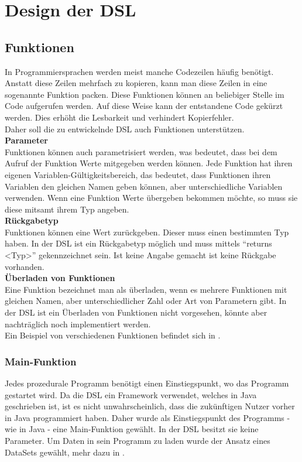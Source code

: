 
\chapter{Design der DSL}

\section{Funktionen}
In Programmiersprachen werden meist manche Codezeilen häufig benötigt.
Anstatt diese Zeilen mehrfach zu kopieren, kann man diese Zeilen in eine sogenannte Funktion packen.
Diese Funktionen können an beliebiger Stelle im Code aufgerufen werden.
Auf diese Weise kann der entstandene Code gekürzt werden.
Dies erhöht die Lesbarkeit und verhindert Kopierfehler.\\
Daher soll die zu entwickelnde \ac{DSL} auch Funktionen unterstützen.\\
\textbf{Parameter}\\
Funktionen können auch parametrisiert werden, was bedeutet, dass bei dem Aufruf der Funktion Werte mitgegeben werden können.
Jede Funktion hat ihren eigenen Variablen-Gültigkeitsbereich, das bedeutet, dass Funktionen ihren Variablen den gleichen Namen geben können, aber unterschiedliche Variablen verwenden.
Wenn eine Funktion Werte übergeben bekommen möchte, so muss sie diese mitsamt ihrem Typ angeben.\\
\textbf{Rückgabetyp}\\
Funktionen können eine Wert zurückgeben.
Dieser muss einen bestimmten Typ haben.
In der DSL ist ein Rückgabetyp möglich und muss mittels ``returns <Typ>'' gekennzeichnet sein.
Ist keine Angabe gemacht ist keine Rückgabe vorhanden.\\
\textbf{Überladen von Funktionen}\\
Eine Funktion bezeichnet man als überladen, wenn es mehrere Funktionen mit gleichen Namen, aber unterschiedlicher Zahl oder Art von Parametern gibt.
In der DSL ist ein Überladen von Funktionen nicht vorgesehen, könnte aber nachträglich noch implementiert werden.\\
Ein Beispiel von verschiedenen Funktionen befindet sich in .\\

\subsection{Main-Funktion}
Jedes prozedurale Programm benötigt einen Einstiegspunkt, wo das Programm gestartet wird.
Da die DSL ein Framework verwendet, welches in Java geschrieben ist, ist es nicht unwahrscheinlich, dass die zukünftigen Nutzer vorher in Java programmiert haben.
Daher wurde als Einstiegspunkt des Programms - wie in Java - eine Main-Funktion gewählt.
In der DSL besitzt sie keine Parameter.
Um Daten in sein Programm zu laden wurde der Ansatz eines DataSets gewählt, mehr dazu in .

